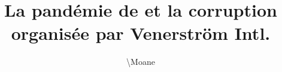 \usepackage[]{ucs}
\usepackage[fontsize=12pt]{fontsize}
\usepackage[]{palatino}
\usepackage[french]{babel}
\usepackage[]{hyperref}
	\hypersetup{
		colorlinks=true,
		linkcolor=blue,
		urlcolor=blue,
		filecolor=blue
	}
\usepackage[b5paper,left=25mm, right=25mm, top=25mm, bottom=25mm]{geometry}
\renewcommand{\baselinestretch}{1.125}
\setlength{\parskip}{0.5em}
\date{}
\author{\textbackslash{}Moane}
\title{La pandémie de  et la corruption organisée par Venerström Intl.}